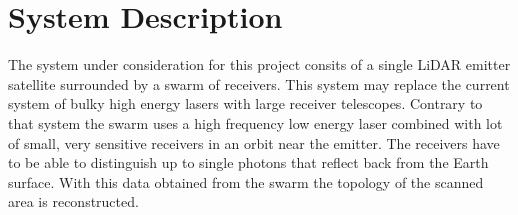 \section{System Description}
\label{dsePPSystemDescription}
The system under consideration for this project consits of a single LiDAR emitter satellite surrounded by a swarm of receivers. This system may replace the current system of bulky high energy lasers with large receiver telescopes. Contrary to that system the swarm uses a high frequency low energy laser combined with lot of small, very sensitive receivers in an orbit near the emitter. The receivers have to be able to distinguish up to single photons that reflect back from the Earth surface. With this data obtained from the swarm the topology of the scanned area is reconstructed.